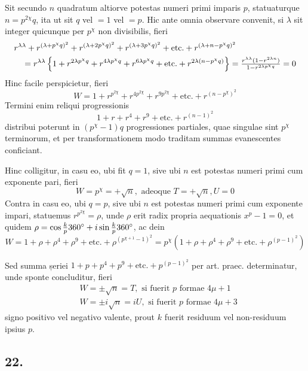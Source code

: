 \documentclass[twoside,12pt, showframe]{memoir}
\let\oldfrac\frac
\def\frac#1#2{\mathchoice{\tfrac{#1}{#2}}{\oldfrac{#1}{#2}}{\genfrac{}{}{}{2}{#1}{#2\mathstrut}}{\genfrac{}{}{}{3}{#1}{#2\mathstrut}}}
\begin{document}
Sit secundo \(n\) quadratum altiorve potestas numeri primi imparis \(p\), statuaturque \(n=p^{2 \chi} q\), ita ut sit \(q\) vel \(=1\) vel \(=p\). Hic ante omnia observare convenit, si \(\lambda\) sit integer quicunque per \(p^{\chi}\) non divisibilis, fieri\clearpage\noindent%
\[\begin{aligned}
& r^{\lambda \lambda}+r^{(\lambda+p^{\chi} q)^{2}}+r^{(\lambda+2 p^{\chi} q)^{2}}+r^{(\lambda+3 p^{\chi} q)^{2}}+\text{etc.}+r^{(\lambda+n-p^{\chi} q)^{2}} \\
& \quad=r^{\lambda \lambda}\left\{1+r^{2 \lambda p^{\chi} q}+r^{4 \lambda p^{\chi} q}+r^{6 \lambda p^{\chi} q}+\text{etc.}+r^{2 \lambda(n-p^{\chi} q)}\right\}=\frac{r^{\lambda \lambda}(1-r^{2 \lambda n})}{1-r^{2 \lambda p^{\chi} q}}=0
\end{aligned}\]
Hinc facile perspicietur, fieri
\[W=1+r^{p^{2 \chi}}+r^{4 p^{2 \chi}}+r^{9 p^{2 \chi}}+\text{etc.}+r^{(n-p^{\chi})^{2}}\]
Termini enim reliqui progressionis
\[1+r+r^{4}+r^{9}+\text{etc.}+r^{(n-1)^{2}}\]
distribui poterunt in \((p^{\chi}-1) q\) progressiones partiales, quae singulae sint \(p^{\chi}\) terminorum, et per transformationem modo traditam summas evanescentes conficiant.

Hinc colligitur, in casu eo, ubi fit \(q=1\), sive ubi \(n\) est potestas numeri primi cum exponente pari, fieri
\[W=p^{\chi}=+\surd n, \text{ adeoque } T=+\surd n, U=0\]
Contra in casu eo, ubi \(q=p\), sive ubi \(n\) est potestas numeri primi cum exponente impari, statuemus \(r^{p^{2\chi}}=\rho\), unde \(\rho\) erit radix propria aequationis \(x^{p}-1=0\), et quidem \(\rho=\cos \frac{k}{p} 360^{\circ}+i \sin \frac{k}{p} 360^{\circ}\), ac dein
\[W=1+\rho+\rho^{4}+\rho^{9}+\text{etc.}+\rho^{(p^{\chi+1}-1)^{2}}=p^{\chi}(1+\rho+\rho^{4}+\rho^{9}+\text{etc.}+\rho^{(p-1)^{2}})\]

Sed summa șeriei \(1+p+p^{4}+p^{9}+\text{etc.}+p^{(p-1)^{2}}\) per art. praec. determinatur, unde sponte concluditur, fieri
\[\begin{aligned}
& W= \pm \sqrt{n}=T, \text{ si fuerit } p \text{ formae } 4 \mu+1 \\
& W= \pm i \sqrt{n}=i U, \text{ si fuerit } p \text{ formae } 4 \mu+3
\end{aligned}\]
signo positivo vel negativo valente, prout \(k\) fuerit residuum vel non-residuum ipsius \(p\).

\subsection*{22.}
 
\end{document}
